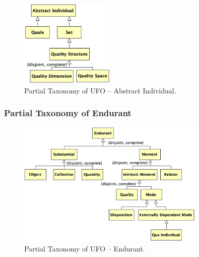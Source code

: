 \documentclass{article}
\newcommand{\BeginAbstractIndividualTaxonomy}{51}
\newcommand{\EndAbstractIndividualTaxonomy}{86}
\newcommand{\BeginEndurantTaxonomy}{88}
\newcommand{\EndEndurantTaxonomy}{145}
\begin{document}

\begin{figure}[ht]
    \centering
    \includegraphics[width=0.4\textwidth]{diagrams/Abstract_Individual_Diagram.png}
    \caption{Partial Taxonomy of UFO -- Abstract Individual.}
    \label{fig:ufo_taxonomy_abstract_individual}
\end{figure}



\subsubsection{Partial Taxonomy of Endurant}

\begin{figure}[ht]
    \centering
    \includegraphics[width=0.8\textwidth]{diagrams/Endurant_Diagram.png}
    \caption{Partial Taxonomy of UFO -- Endurant.}
    \label{fig:ufo_taxonomy_endurant}
\end{figure}


\end{document}
